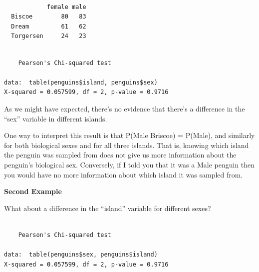 \documentclass[
  letterpaper,
  DIV=11,
  numbers=noendperiod,
  oneside]{scrreprt}
\newenvironment{Shaded}{\begin{snugshade}}{\end{snugshade}}
\newcommand{\FunctionTok}[1]{\textcolor[rgb]{0.28,0.35,0.67}{#1}}
\newcommand{\NormalTok}[1]{\textcolor[rgb]{0.00,0.23,0.31}{#1}}
\newcommand{\SpecialCharTok}[1]{\textcolor[rgb]{0.37,0.37,0.37}{#1}}
\begin{document}
\begin{verbatim}
           
            female male
  Biscoe        80   83
  Dream         61   62
  Torgersen     24   23
\end{verbatim}

\begin{Shaded}
\end{Shaded}

\begin{verbatim}

    Pearson's Chi-squared test

data:  table(penguins$island, penguins$sex)
X-squared = 0.057599, df = 2, p-value = 0.9716
\end{verbatim}

As we might have expected, there's no evidence that there's a difference
in the ``sex'' variable in different islands.

One way to interpret this result is that P(Male \textbar{} Briscoe) =
P(Male), and similarly for both biological sexes and for all three
islands. That is, knowing which island the penguin was sampled from does
not give us more information about the penguin's biological sex.
Conversely, if I told you that it was a Male penguin then you would have
no more information about which island it was sampled from.

\textbf{Second Example}

What about a difference in the ``island'' variable for different sexes?

\begin{Shaded}
\end{Shaded}

\begin{verbatim}

    Pearson's Chi-squared test

data:  table(penguins$sex, penguins$island)
X-squared = 0.057599, df = 2, p-value = 0.9716
\end{verbatim}
\end{document}
